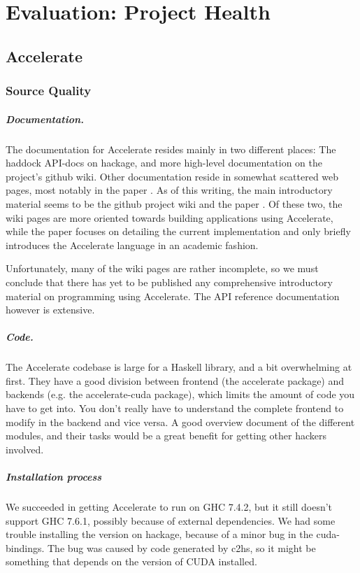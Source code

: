 \chapter{Evaluation: Project Health}

\section{Accelerate}
\subsection{Source Quality}

\paragraph{Documentation.} The documentation for Accelerate resides mainly in
two different places: The haddock API-docs on hackage, and more high-level
documentation on the project's github wiki.  Other documentation reside in
somewhat scattered web pages, most notably in the paper
\cite{chakravarty2011accelerating}.  As of this writing, the main introductory
material seems to be the github project wiki and the paper
\cite{chakravarty2011accelerating}. Of these two, the wiki pages are more
oriented towards building applications using Accelerate, while the paper
focuses on detailing the current implementation and only briefly introduces the
Accelerate language in an academic fashion.

Unfortunately, many of the wiki pages are rather incomplete, so we must
conclude that there has yet to be published any comprehensive introductory
material on programming using Accelerate.
The API reference documentation however is extensive.

\paragraph{Code.} The Accelerate codebase is large for a Haskell library, and
a bit overwhelming at first. They have a good division between frontend (the
accelerate package) and backends (e.g. the accelerate-cuda package), which
limits the amount of code you have to get into. You don't really have to
understand the complete frontend to modify in the backend and vice versa. A
good overview document of the different modules, and their tasks would be a
great benefit for getting other hackers involved.

\paragraph{Installation process} We succeeded in getting Accelerate to run on
GHC 7.4.2, but it still doesn't support GHC 7.6.1, possibly because of external
dependencies.  We had some trouble installing the version on hackage, because
of a minor bug in the cuda-bindings. The bug was caused by code generated by
c2hs, so it might be something that depends on the version of CUDA installed.

